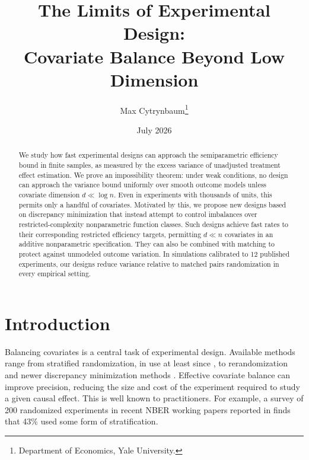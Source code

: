 \documentclass[letterpaper,12pt]{article}
\title{The Limits of Experimental Design: \\ Covariate Balance Beyond Low Dimension}
\author{Max Cytrynbaum\thanks{Department of Economics, Yale University.}}
\date{July 2026}
\theoremstyle{definition}
\numberwithin{equation}{section}
\begin{document}
\begingroup
\renewcommand{\thefootnote}{\fnsymbol{footnote}}
\maketitle
\endgroup
\setcounter{footnote}{0}

\begin{abstract}
We study how fast experimental designs can approach the semiparametric efficiency bound in finite samples, as measured by the excess variance of unadjusted treatment effect estimation.
We prove an impossibility theorem: under weak conditions, no design can approach the variance bound uniformly over smooth outcome models unless covariate dimension $d \ll \log n$.
Even in experiments with thousands of units, this permits only a handful of covariates.
Motivated by this, we propose new designs based on discrepancy minimization that instead attempt to control imbalances over restricted-complexity nonparametric function classes.
Such designs achieve fast rates to their corresponding restricted efficiency targets, permitting $d \ll n$ covariates in an additive nonparametric specification.
They can also be combined with matching to protect against unmodeled outcome variation.
In simulations calibrated to 12 published experiments, our designs reduce variance relative to matched pairs randomization in every empirical setting.
\end{abstract}



\clearpage

\section{Introduction}\label{section:introduction}

Balancing covariates is a central task of experimental design.
Available methods range from stratified randomization, in use at least since \citet{fisher1926}, to rerandomization and newer discrepancy minimization methods \citep{li2018asymptotic,harshaw2024gsw}.
Effective covariate balance can improve precision, reducing the size and cost of the experiment required to study a given causal effect.
This is well known to practitioners. 
For example, a survey of 200 randomized experiments in recent NBER working papers reported in \citet{cytrynbaum2022local} finds that 43\% used some form of stratification.
\end{document}
